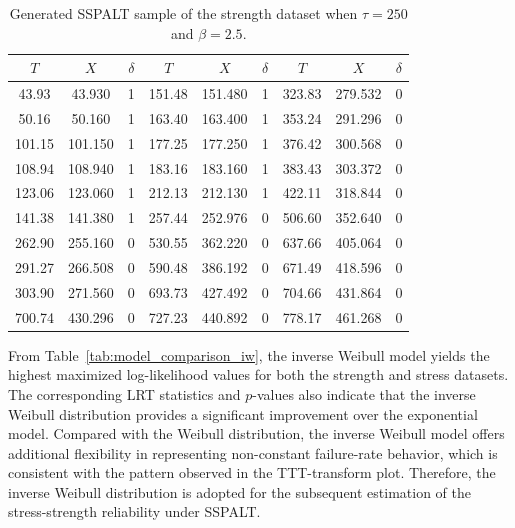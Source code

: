 \documentclass[twoside]{article}
\begin{document}
\begin{table}[t]
	\centering
	\caption{Generated SSPALT sample of the strength dataset when $\tau=250$ and $\beta=2.5$.}
	\label{tab:sspalt_iw}
	\scriptsize
	\setlength{\tabcolsep}{4pt}
	\begin{tabular}{ccc|ccc|ccc}
		\hline
		$T$ & $X$ & $\delta$ & $T$ & $X$ & $\delta$ & $T$ & $X$ & $\delta$ \\
		\hline
		43.93  & 43.930  & 1 & 151.48 & 151.480 & 1 & 323.83 & 279.532 & 0 \\
		50.16  & 50.160  & 1 & 163.40 & 163.400 & 1 & 353.24 & 291.296 & 0 \\
		101.15 & 101.150 & 1 & 177.25 & 177.250 & 1 & 376.42 & 300.568 & 0 \\
		108.94 & 108.940 & 1 & 183.16 & 183.160 & 1 & 383.43 & 303.372 & 0 \\
		123.06 & 123.060 & 1 & 212.13 & 212.130 & 1 & 422.11 & 318.844 & 0 \\
		141.38 & 141.380 & 1 & 257.44 & 252.976 & 0 & 506.60 & 352.640 & 0 \\
		262.90 & 255.160 & 0 & 530.55 & 362.220 & 0 & 637.66 & 405.064 & 0 \\
		291.27 & 266.508 & 0 & 590.48 & 386.192 & 0 & 671.49 & 418.596 & 0 \\
		303.90 & 271.560 & 0 & 693.73 & 427.492 & 0 & 704.66 & 431.864 & 0 \\
		700.74 & 430.296 & 0 & 727.23 & 440.892 & 0 & 778.17 & 461.268 & 0 \\
		\hline
	\end{tabular}
\end{table}
From Table~\ref{tab:model_comparison_iw}, the inverse Weibull model yields the highest maximized log-likelihood values for both the strength and stress datasets. The corresponding LRT statistics and $p$-values also indicate that the inverse Weibull distribution provides a significant improvement over the exponential model. Compared with the Weibull distribution, the inverse Weibull model offers additional flexibility in representing non-constant failure-rate behavior, which is consistent with the pattern observed in the TTT-transform plot. Therefore, the inverse Weibull distribution is adopted for the subsequent estimation of the stress-strength reliability under SSPALT.
\vspace{-0.5cm}
\end{document}

